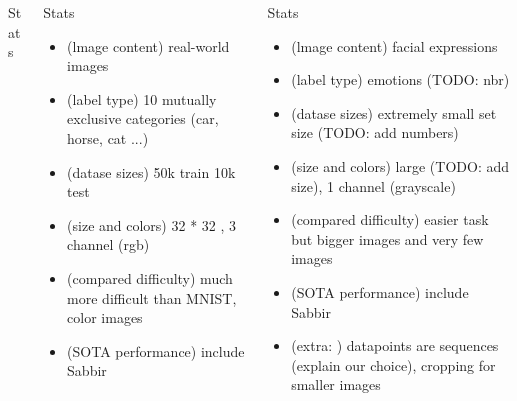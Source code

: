\documentclass[final]{beamer}
\newlength{\onecolwid}
\newlength{\threecolwid}
\begin{document}
\begin{frame}[t]
\begin{columns}[t]
\begin{column}{\threecolwid}
\begin{columns}[t, totalwidth=\threecolwid]
\begin{column}{\onecolwid}
\begin{block}{Stats}
\begin{itemize}
\end{itemize}
\end{block}
\end{column}
\begin{column}{\onecolwid}
\begin{block}{Stats}
\begin{itemize}
\item (lmage content) real-world images
\item (label type) 10 mutually exclusive categories (car, horse, cat ...)
\item (datase sizes) 50k train 10k test
\item (size and colors) 32 * 32 , 3 channel (rgb)
\item (compared difficulty) much more difficult than MNIST, color images
\item (SOTA performance) include Sabbir
\end{itemize}
\end{block}
\end{column}

\begin{column}{\onecolwid}
\begin{block}{Stats}
\begin{itemize}
\item (lmage content) facial expressions
\item (label type) emotions (TODO: nbr)
\item (datase sizes) extremely small set size (TODO: add numbers)
\item (size and colors) large (TODO: add size), 1 channel (grayscale) 
\item (compared difficulty) easier task but bigger images and very few images
\item (SOTA performance) include Sabbir
\item (extra: ) datapoints are sequences (explain our choice), cropping for smaller images

\end{itemize}
\end{block}
\end{column}
\end{columns}

\begin{columns}[t, totalwidth=\threecolwid] %



\end{columns}
\end{column}
\end{columns}
\end{frame}
\end{document}
